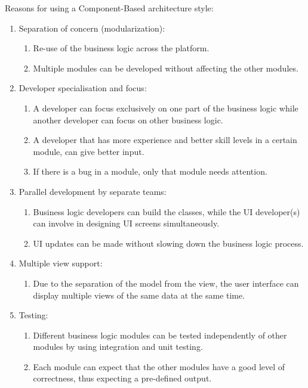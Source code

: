 Reasons for using a Component-Based architecture style:
	\begin{enumerate}
		\item Separation of concern (modularization):
		\begin{enumerate}
			\item Re-use of the business logic across the platform.
			\item Multiple modules can be developed without affecting the other modules.
		\end{enumerate}
		
		\item Developer specialisation and focus:
		\begin{enumerate}
			\item A developer can focus exclusively on one part of the business logic while another developer can focus on other business logic.
			\item A developer that has more experience and better skill levels in a certain module, can give better input.
			\item If there is a bug in a module, only that module needs attention.
		\end{enumerate}
		
		\item Parallel development by separate teams:
		\begin{enumerate}
			\item Business logic developers can build the classes, while the UI developer(s) can involve in designing UI screens simultaneously.
			\item UI updates can be made without slowing down the business logic process.
		\end{enumerate}
		
		\item Multiple view support:
		\begin{enumerate}
			\item Due to the separation of the model from the view, the user interface can display multiple views of the same data at the same time.
		\end{enumerate}
		
		\item Testing:
		\begin{enumerate}
			\item Different business logic modules can be tested independently of other modules by using integration and unit testing.
			\item Each module can expect that the other modules have a good level of correctness, thus expecting a pre-defined output.
		\end{enumerate}
	\end{enumerate}

